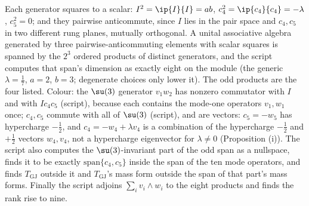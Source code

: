 Each generator squares to a scalar: $I^{2} = \ip{I}{I} = ab$, $c_{4}^{2} = \ip{c_{4}}{c_{4}} = -\lambda$, $c_{5}^{2} = 0$; and they pairwise anticommute, since $I$ lies in the pair space and $c_{4}, c_{5}$ in two different rung planes, mutually orthogonal. A unital associative algebra generated by three pairwise-anticommuting elements with scalar squares is spanned by the $2^{3}$ ordered products of distinct generators, and the script computes that span's dimension as exactly eight on the module (the generic $\lambda = \tfrac17$, $a = 2$, $b = 3$; degenerate choices only lower it). The odd products are the four listed. Colour: the $\su(3)$ generator $v_{1}w_{2}$ has nonzero commutator with $I$ and with $Ic_{4}c_{5}$ (script), because each contains the mode-one operators $v_{1}, w_{1}$ once; $c_{4}, c_{5}$ commute with all of $\su(3)$ (script), and are vectors: $c_{5} = -w_{5}$ has hypercharge $-\tfrac12$, and $c_{4} = -w_{4} + \lambda v_{4}$ is a combination of the hypercharge $-\tfrac12$ and $+\tfrac12$ vectors $w_{4}, v_{4}$, not a hypercharge eigenvector for $\lambda \ne 0$ (Proposition (i)). The script also computes the $\su(3)$-invariant part of the odd span as a nullspace, finds it to be exactly $\mathrm{span}\{c_{4}, c_{5}\}$ inside the span of the ten mode operators, and finds $T_{\mathrm{GJ}}$ outside it and $T_{\mathrm{GJ}}$'s mass form outside the span of that part's mass forms. Finally the script adjoins $\sum_{i}v_{i}\wedge w_{i}$ to the eight products and finds the rank rise to nine.
